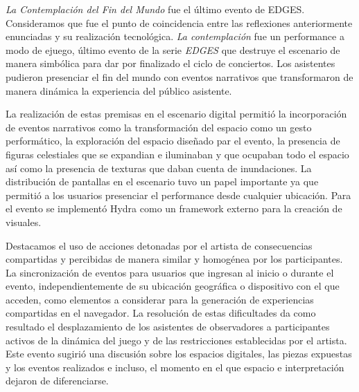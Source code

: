\textit{La Contemplación del Fin del Mundo} fue el último evento de EDGES. Consideramos que fue el punto de coincidencia entre las reflexiones anteriormente enunciadas y su realización tecnológica. \textit{La contemplación} fue un performance a modo de ejuego, último evento de la serie \textit{EDGES} que destruye el escenario de manera simbólica para dar por finalizado el ciclo de conciertos. Los asistentes pudieron presenciar el fin del mundo con eventos narrativos que transformaron de manera dinámica la experiencia del público asistente. 

La realización de estas premisas en el escenario digital permitió la incorporación de eventos narrativos como la transformación del espacio como un gesto performático, la exploración del espacio diseñado par el evento, la presencia de figuras celestiales que se expandian e iluminaban y que ocupaban todo el espacio así como la presencia de texturas que daban cuenta de inundaciones. La distribución de pantallas en el escenario tuvo un papel importante ya que permitió a los usuarios presenciar el performance desde cualquier ubicación. Para el evento se implementó Hydra \citep{hydra} como un framework externo para la creación de visuales.


Destacamos el uso de acciones detonadas por el artista de consecuencias compartidas y percibidas de manera similar y homogénea por los participantes. La sincronización de eventos para usuarios que ingresan al inicio o durante el evento, independientemente de su ubicación geográfica o dispositivo con el que acceden, como elementos a considerar para la generación de experiencias compartidas en el navegador. La resolución de estas dificultades da como resultado el desplazamiento de los asistentes de observadores a participantes activos de la dinámica del juego y de las restricciones establecidas por el artista. Este evento sugirió una discusión sobre los espacios digitales, las piezas expuestas y los eventos realizados e incluso, el momento en el que espacio e interpretación dejaron de diferenciarse. 


